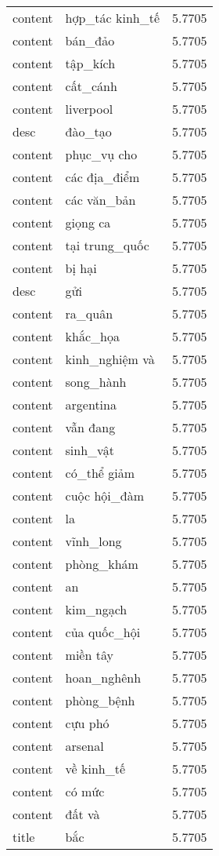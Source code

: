 \documentclass{article}
\begin{document}
\begin{tabular}{lll}
content & hợp\_tác kinh\_tế & 5.7705\\
content & bán\_đảo & 5.7705\\
content & tập\_kích & 5.7705\\
content & cất\_cánh & 5.7705\\
content & liverpool & 5.7705\\
desc & đào\_tạo & 5.7705\\
content & phục\_vụ cho & 5.7705\\
content & các địa\_điểm & 5.7705\\
content & các văn\_bản & 5.7705\\
content & giọng ca & 5.7705\\
content & tại trung\_quốc & 5.7705\\
content & bị hại & 5.7705\\
desc & gửi & 5.7705\\
content & ra\_quân & 5.7705\\
content & khắc\_họa & 5.7705\\
content & kinh\_nghiệm và & 5.7705\\
content & song\_hành & 5.7705\\
content & argentina & 5.7705\\
content & vẫn đang & 5.7705\\
content & sinh\_vật & 5.7705\\
content & có\_thể giảm & 5.7705\\
content & cuộc hội\_đàm & 5.7705\\
content & la & 5.7705\\
content & vĩnh\_long & 5.7705\\
content & phòng\_khám & 5.7705\\
content & an & 5.7705\\
content & kim\_ngạch & 5.7705\\
content & của quốc\_hội & 5.7705\\
content & miền tây & 5.7705\\
content & hoan\_nghênh & 5.7705\\
content & phòng\_bệnh & 5.7705\\
content & cựu phó & 5.7705\\
content & arsenal & 5.7705\\
content & về kinh\_tế & 5.7705\\
content & có mức & 5.7705\\
content & đất và & 5.7705\\
title & bắc & 5.7705\\

\end{tabular}
\end{document}

